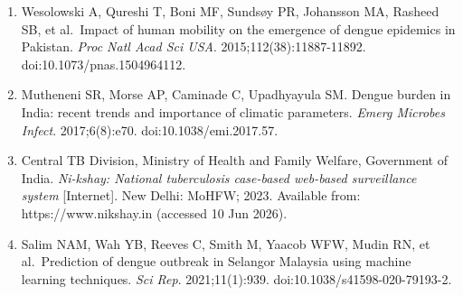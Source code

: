 \documentclass[
  10pt,
  twocolumn]{article}
\begin{document}
\begin{enumerate}
  doi:10.1038/s41597-024-03120-7. Available from: https://opendengue.org
  (accessed 5 Jan 2025).
\item
  Wesolowski A, Qureshi T, Boni MF, Sundsøy PR, Johansson MA, Rasheed
  SB, et al.~Impact of human mobility on the emergence of dengue
  epidemics in Pakistan. \emph{Proc Natl Acad Sci USA}.
  2015;112(38):11887-11892. doi:10.1073/pnas.1504964112.
\item
  Mutheneni SR, Morse AP, Caminade C, Upadhyayula SM. Dengue burden in
  India: recent trends and importance of climatic parameters.
  \emph{Emerg Microbes Infect}. 2017;6(8):e70. doi:10.1038/emi.2017.57.
\item
  Central TB Division, Ministry of Health and Family Welfare, Government
  of India. \emph{Ni-kshay: National tuberculosis case-based web-based
  surveillance system} {[}Internet{]}. New Delhi: MoHFW; 2023. Available
  from: https://www.nikshay.in (accessed 10 Jun 2026).
\item
  Salim NAM, Wah YB, Reeves C, Smith M, Yaacob WFW, Mudin RN, et
  al.~Prediction of dengue outbreak in Selangor Malaysia using machine
  learning techniques. \emph{Sci Rep}. 2021;11(1):939.
  doi:10.1038/s41598-020-79193-2.
\end{enumerate}
\end{document}

